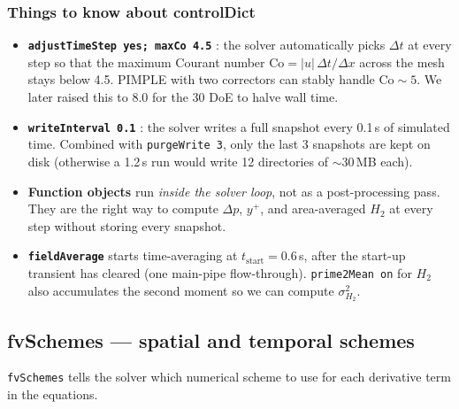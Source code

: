 \documentclass[11pt,a4paper]{article}
\begin{document}
\subsubsection{Things to know about controlDict}

\begin{itemize}[leftmargin=1.5em]
    \item \textbf{\texttt{adjustTimeStep yes; maxCo 4.5}} : the solver
    automatically picks $\Delta t$ at every step so that the maximum
    Courant number $\mathrm{Co}=|u|\,\Delta t/\Delta x$ across the mesh
    stays below 4.5. PIMPLE with two correctors can stably handle
    $\mathrm{Co}\sim 5$. We later raised this to 8.0 for the 30\textdegree{}
    DoE to halve wall time.
    \item \textbf{\texttt{writeInterval 0.1}} : the solver writes a
    full snapshot every 0.1\,s of simulated time. Combined with
    \texttt{purgeWrite 3}, only the last 3 snapshots are kept on disk
    (otherwise a 1.2\,s run would write 12 directories of $\sim 30$\,MB
    each).
    \item \textbf{Function objects} run \emph{inside the solver loop},
    not as a post-processing pass. They are the right way to compute
    $\Delta p$, $y^+$, and area-averaged $H_2$ at every step without
    storing every snapshot.
    \item \textbf{\texttt{fieldAverage}} starts time-averaging at
    $t_\mathrm{start}=0.6$\,s, after the start-up transient has cleared
    (one main-pipe flow-through). \texttt{prime2Mean on} for $H_2$ also
    accumulates the second moment so we can compute $\sigma_{H_2}^2$.
\end{itemize}

\subsection{fvSchemes --- spatial and temporal schemes}

\texttt{fvSchemes} tells the solver which numerical scheme to use for
each derivative term in the equations.
\end{document}
